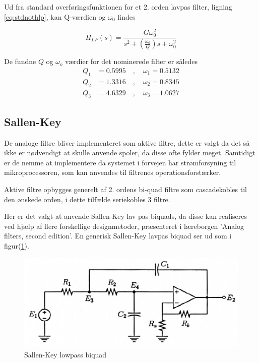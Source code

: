 Ud fra standard overføringsfunktionen for et 2. orden lavpas filter, ligning \ref{eq:stdnothlp}, kan Q-værdien og $\omega_0$ findes 

\begin{equation}
\label{eq:stdnothlp}
H_{LP}(s) = \frac{G\omega_0^2}{s^2 + \left(\frac{\omega_0}{Q}\right)s + \omega_0^2}
\end{equation}

De fundne $Q$ og $\omega_o$ værdier for det nominerede filter er således
\begin{align}
	Q_1 &= \num{0.5995} \quad , \quad \omega_1= \num{0.5132} \nonumber \\
	Q_2 &= \num{1.3316} \quad , \quad \omega_2= \num{0.8345} \nonumber \\
	Q_3 &= \num{4.6329} \quad , \quad \omega_3= \num{1.0627} \label{eq:q_and_w_norm}
\end{align}

\subsection{Sallen-Key}

De analoge filtre bliver implementeret som aktive filtre, dette er valgt da det så ikke er nødvendigt at skulle anvende spoler, da disse ofte fylder meget.
Samtidigt er de nemme at implementere da systemet i forvejen har strømforsyning til mikroprocessoren, som kan anvendes til filtrenes operationsforstærker.

Aktive filtre opbygges generelt af 2. ordens bi-quad filtre som cascadekobles til den ønskede orden,
i dette tilfælde seriekobles 3 filtre. 


Her er det valgt at anvende Sallen-Key lav pas biquads,
da disse kan realiseres ved hjælp af flere forskellige designmetoder, præsenteret 
i læreborgen 'Analog filters, second edition'\cite{KendallSu}.
En generisk Sallen-Key lavpas biquad ser ud som i figur(\ref{fig:sklpbq}).

\begin{figure}[H]
	\centering
	\includegraphics[width=.6\textwidth]{billeder/sklpbq}
	\caption{Sallen-Key lowpass biquad \cite{KendallSu}}
	\label{fig:sklpbq}
\end{figure}

